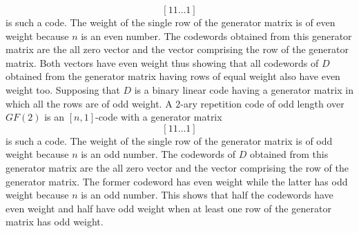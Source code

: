 \[
	\left[11\ldots1\right]
\]
is such a code. The weight of the single row of the generator matrix is of even weight because $n$ is an even number. The codewords obtained from this generator matrix are the all zero vector and the vector comprising the row of the generator matrix.  Both vectors have even weight thus showing that all codewords of $D$ obtained from the generator matrix having rows of equal weight also have even weight too.
\qsubpart
Supposing that $D$ is a binary linear code having a generator matrix
in which all the rows are of odd weight. A $2$-ary repetition code of odd length over $GF(2)$ is an $[n,1]$-code with a generator matrix
\[
	\left[11\ldots1\right]
\]
is such a code. The weight of the single row of the generator matrix is of odd weight because $n$ is an odd number. The codewords of $D$ obtained from this generator matrix are the all zero vector and the vector comprising the row of the generator matrix.  The former codeword has even weight while the latter has odd weight because $n$ is an odd number.  This shows that half the codewords have even weight and half have odd weight when at least one row of the generator matrix has odd weight.